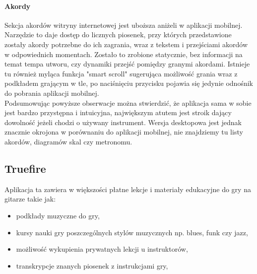 
\paragraph{Akordy}
Sekcja akordów witryny internetowej jest uboższa aniżeli w aplikacji mobilnej. Narzędzie to daje dostęp do licznych piosenek, przy których przedstawione zostały akordy potrzebne do ich zagrania, wraz z tekstem i przejściami akordów w odpowiednich momentach. Zostało to zrobione statycznie, bez informacji na temat tempa utworu, czy dynamiki przejść pomiędzy granymi akordami. Istnieje tu również myląca funkcja "smart scroll" sugerująca możliwość grania wraz z podkładem grającym w tle, po naciśnięciu przycisku pojawia się jedynie odnośnik do pobrania aplikacji mobilnej.\\


Podsumowując powyższe obserwacje można stwierdzić, że aplikacja sama w sobie jest bardzo przystępna i intuicyjna, największym atutem jest stroik dający dowolność jeżeli chodzi o używany instrument. Wersja desktopowa jest jednak znacznie okrojona w porównaniu do aplikacji mobilnej, nie znajdziemy tu listy akordów, diagramów skal czy metronomu. 

\subsection{Truefire}
Aplikacja ta zawiera w większości płatne lekcje i materiały edukacyjne do gry na gitarze takie jak:
\begin{itemize}
    \item podkłady muzyczne do gry,
    \item kursy nauki gry poszczególnych stylów muzycznych np. blues, funk czy jazz,
    \item możliwość wykupienia prywatnych lekcji u instruktorów,
    \item transkrypcje znanych piosenek z instrukcjami gry,
\end{itemize}

